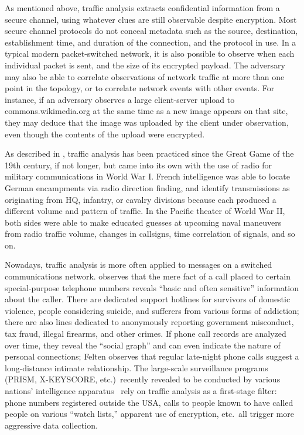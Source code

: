 \documentclass[oneside]{zarticle}
\begin{document}
As mentioned above, traffic analysis extracts confidential information
from a secure channel, using whatever clues are still observable
despite encryption.  Most secure channel protocols do not conceal
metadata such as the source, destination, establishment time, and
duration of the connection, and the protocol in use.  In a typical
modern packet-switched network, it is also possible to observe when
each individual packet is sent, and the size of its encrypted payload.
The adversary may also be able to correlate observations of network
traffic at more than one point in the topology, or to correlate
network events with other events.  For instance, if an adversary
observes a large client-server upload to \textsf{commons.wikimedia.org}
at the same time as a new image appears on that site, they may deduce
that the image was uploaded by the client under observation, even
though the contents of the upload were encrypted.

As described in \textcite{kahn1967codebreakers}, traffic analysis has
been practiced since the Great Game of the 19th century, if not
longer, but came into its own with the use of radio for military
communications in World War I.  French intelligence was able to locate
German encampments via radio direction finding, and identify
transmissions as originating from HQ, infantry, or cavalry divisions
because each produced a different volume and pattern of traffic.  In
the Pacific theater of World War II, both sides were able to make
educated guesses at upcoming naval maneuvers from radio traffic
volume, changes in callsigns, time correlation of signals, and so on.

Nowadays, traffic analysis is more often applied to messages on a
switched communications network.  \textcite{felten2013decl} observes
that the mere fact of a call placed to certain special-purpose
telephone numbers reveals “basic and often sensitive” information
about the caller.  There are dedicated support hotlines for survivors
of domestic violence, people considering suicide, and sufferers from
various forms of addiction; there are also lines dedicated to
anonymously reporting government misconduct, tax fraud, illegal
firearms, and other crimes.  If phone call records are analyzed over
time, they reveal the “social graph” and can even indicate the nature
of personal connections; Felten observes that regular late-night phone
calls suggest a long-distance intimate relationship.  The large-scale
surveillance programs (PRISM, X-KEYSCORE, etc.)\ recently revealed to
be conducted by various nations' intelligence
apparatus~\cite{greenwald2013nsa} rely on traffic analysis as a
first-stage filter: phone numbers registered outside the USA, calls to
people known to have called people on various “watch lists,” apparent
use of encryption, etc.\ all trigger more aggressive data collection.
\end{document}
